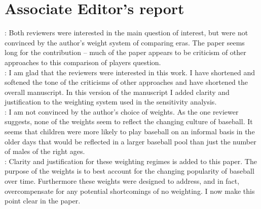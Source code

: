 \documentclass[11pt]{article}
\begin{document}
 

 
\section*{Associate Editor's report}



: 
Both reviewers were interested in the main question of interest, but were not 
convinced by the author's weight system of comparing eras.  The paper seems 
long for the contribution -- much of the paper appears to be criticism of 
other approaches to this comparison of players question. \\

: I am glad that the reviewers were interested in this 
work. I have shortened and softened the tone of the criticisms of other 
approaches and have shortened the overall manuscript.  In this version of the 
manuscript I added clarity and justification to the weighting system used in 
the sensitivity analysis.   \\



:
I am not convinced by the author's choice of weights.  As the one reviewer 
suggests, none of the weights seem to reflect the changing culture of 
baseball.  It seems that children were more likely to play baseball on an 
informal basis in the older days that would be reflected in a larger baseball 
pool than just the number of males of the right ages. \\

: Clarity and justification for these weighting regimes 
is added to this paper.  The purpose of the weights is to best account for the 
changing popularity of baseball over time.  Furthermore these weights were 
designed to address, and in fact, overcompensate for any potential shortcomings 
of no weighting.  I now make this point clear in the paper.
\end{document}
